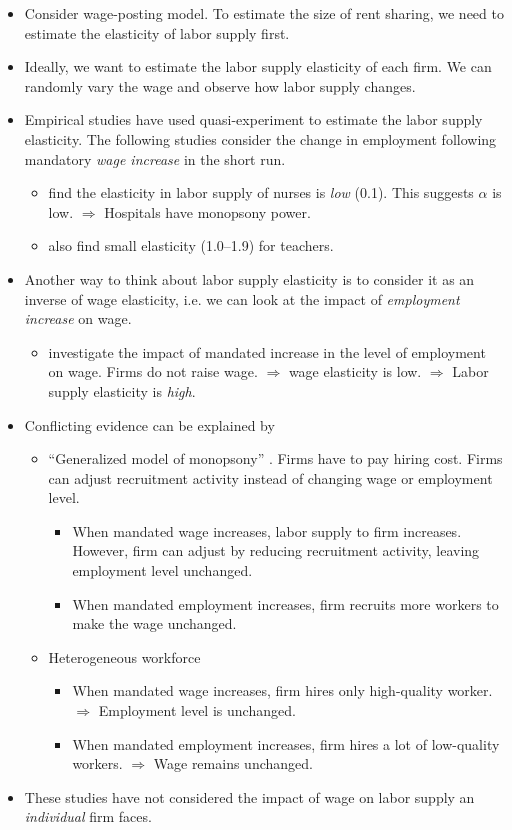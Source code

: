 \documentclass[a4paper, 12pt]{article}
\begin{document}
\begin{itemize}
\item Consider wage-posting model. To estimate the size of rent sharing, we need to estimate the elasticity of labor supply first.
\item Ideally, we want to estimate the labor supply elasticity of each firm. We can randomly vary the wage and observe how labor supply changes.
\item Empirical studies have used quasi-experiment to estimate the labor supply elasticity. The following studies consider the change in employment following mandatory \emph{wage increase} in the short run.
\begin{itemize}
\item \cite{staiger2010there} find the elasticity in labor supply of nurses is \textit{low} (0.1). This suggests $\alpha$ is low. $\Rightarrow$ Hospitals have monopsony power.
\item \cite{falch2010elasticity} also find small elasticity (1.0--1.9) for teachers.
\end{itemize}
\item Another way to think about labor supply elasticity is to consider it as an inverse of wage elasticity, i.e. we can look at the impact of \emph{employment increase} on wage.
\begin{itemize}
\item \cite{matsudaira2014government} investigate the impact of mandated increase in the level of employment on wage. Firms do not raise wage. $\Rightarrow$ wage elasticity is low. $\Rightarrow$ Labor supply elasticity is \emph{high}.
\end{itemize}
\item Conflicting evidence can be explained by
\begin{itemize}
\item ``Generalized model of monopsony'' \citep{manning2006generalised}. Firms have to pay hiring cost. Firms can adjust recruitment activity instead of changing wage or employment level.
\begin{itemize}
\item When mandated wage increases, labor supply to firm increases. However, firm can adjust by reducing recruitment activity, leaving employment level unchanged.
\item When mandated employment increases, firm recruits more workers to make the wage unchanged.
\end{itemize}

\item Heterogeneous workforce
\begin{itemize}
\item When mandated wage increases, firm hires only high-quality worker. $\Rightarrow$ Employment level is unchanged.
\item When mandated employment increases, firm hires a lot of low-quality workers. $\Rightarrow$ Wage remains unchanged.
\end{itemize}
\end{itemize}
\item These studies have not considered the impact of wage on labor supply an \emph{individual} firm faces.
\end{itemize}
\end{document}
